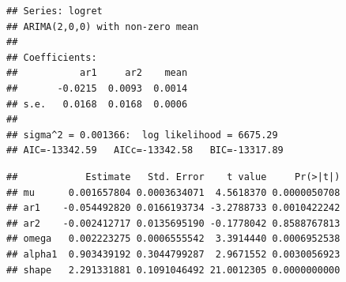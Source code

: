 \documentclass[
]{book}
\newenvironment{Shaded}{\begin{snugshade}}{\end{snugshade}}
\newcommand{\AttributeTok}[1]{\textcolor[rgb]{0.13,0.29,0.53}{#1}}
\newcommand{\CommentTok}[1]{\textcolor[rgb]{0.56,0.35,0.01}{\textit{#1}}}
\newcommand{\DecValTok}[1]{\textcolor[rgb]{0.00,0.00,0.81}{#1}}
\newcommand{\FunctionTok}[1]{\textcolor[rgb]{0.13,0.29,0.53}{\textbf{#1}}}
\newcommand{\NormalTok}[1]{#1}
\newcommand{\OtherTok}[1]{\textcolor[rgb]{0.56,0.35,0.01}{#1}}
\newcommand{\SpecialCharTok}[1]{\textcolor[rgb]{0.81,0.36,0.00}{\textbf{#1}}}
\newcommand{\StringTok}[1]{\textcolor[rgb]{0.31,0.60,0.02}{#1}}
\begin{document}
\begin{verbatim}
## Series: logret 
## ARIMA(2,0,0) with non-zero mean 
## 
## Coefficients:
##           ar1     ar2    mean
##       -0.0215  0.0093  0.0014
## s.e.   0.0168  0.0168  0.0006
## 
## sigma^2 = 0.001366:  log likelihood = 6675.29
## AIC=-13342.59   AICc=-13342.58   BIC=-13317.89
\end{verbatim}

\begin{Shaded}
\end{Shaded}

\begin{verbatim}
##            Estimate   Std. Error    t value     Pr(>|t|)
## mu      0.001657804 0.0003634071  4.5618370 0.0000050708
## ar1    -0.054492820 0.0166193734 -3.2788733 0.0010422242
## ar2    -0.002412717 0.0135695190 -0.1778042 0.8588767813
## omega   0.002223275 0.0006555542  3.3914440 0.0006952538
## alpha1  0.903439192 0.3044799287  2.9671552 0.0030056923
## shape   2.291331881 0.1091046492 21.0012305 0.0000000000
\end{verbatim}
\end{document}
